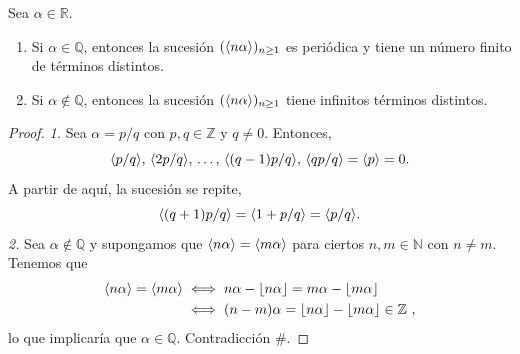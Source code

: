 \begin{proposition}
    \label{prop:periodicidad}
    Sea $\alpha \in \mathbb{R}$.
    \begin{enumerate}
        \item Si $\alpha \in \mathbb{Q}$, entonces la sucesión $(\langle n\alpha \rangle)_{n\ge1}$ es periódica
        y tiene un número finito de términos distintos.
        \item Si $\alpha \notin \mathbb{Q}$, entonces la sucesión $(\langle n\alpha \rangle)_{n\ge1}$ tiene
        infinitos términos distintos.
    \end{enumerate}
\end{proposition}

\begin{proof}
    \textit{1. \quad} Sea $\alpha = p/q$ con $p, q \in \mathbb{Z}$ y $q \neq 0$. Entonces,
    \[
        \langle p/q \rangle, \,
        \langle 2p/q \rangle, \,
        \ldots, \,
        \langle (q-1)p/q \rangle, \,
        \langle qp/q \rangle = \langle p \rangle = 0 .
    \]
    A partir de aquí, la sucesión se repite,
    \[
        \langle (q+1)p/q \rangle = \langle 1 + p/q \rangle = \langle p/q \rangle.
    \]
    \textit{2. \quad} Sea $\alpha \notin \mathbb{Q}$ y supongamos que $\langle n\alpha \rangle = \langle m\alpha \rangle$ 
    para ciertos $n, m \in \mathbb{N}$ con $n \neq m$. Tenemos que
    \begin{align*}
        \langle n\alpha \rangle = \langle m\alpha \rangle
        &\iff n\alpha - \lfloor n\alpha \rfloor = m\alpha - \lfloor m\alpha \rfloor \\
        &\iff (n-m)\alpha = \lfloor n\alpha \rfloor - \lfloor m\alpha \rfloor \in \mathbb{Z} \ ,
    \end{align*}
    lo que implicaría que $\alpha \in \mathbb{Q}$. Contradicción \#.
\end{proof}
